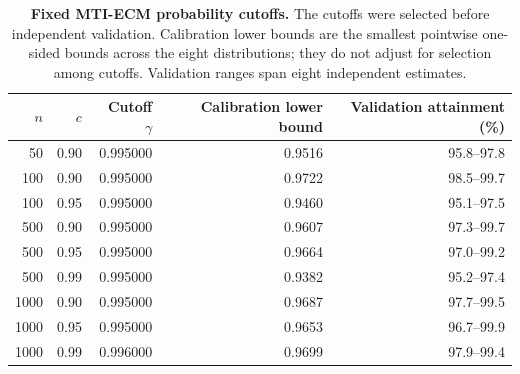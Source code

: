 \begin{table}[!htbp]
\centering
\caption{\textbf{Fixed MTI-ECM probability cutoffs.} The cutoffs were selected before independent validation. Calibration lower bounds are the smallest pointwise one-sided bounds across the eight distributions; they do not adjust for selection among cutoffs. Validation ranges span eight independent estimates.}\label{tab:supp-mti-profile-policy}
\TableStyle
\begin{tabular}{@{}rrrrr@{}}
\toprule
\(n\) & \(c\) & Cutoff \(\gamma\) & Calibration lower bound & Validation attainment (\%)\\
\midrule
50 & 0.90 & 0.995000 & 0.9516 & 95.8--97.8 \\
100 & 0.90 & 0.995000 & 0.9722 & 98.5--99.7 \\
100 & 0.95 & 0.995000 & 0.9460 & 95.1--97.5 \\
500 & 0.90 & 0.995000 & 0.9607 & 97.3--99.7 \\
500 & 0.95 & 0.995000 & 0.9664 & 97.0--99.2 \\
500 & 0.99 & 0.995000 & 0.9382 & 95.2--97.4 \\
1000 & 0.90 & 0.995000 & 0.9687 & 97.7--99.5 \\
1000 & 0.95 & 0.995000 & 0.9653 & 96.7--99.9 \\
1000 & 0.99 & 0.996000 & 0.9699 & 97.9--99.4 \\
\bottomrule
\end{tabular}
\end{table}
